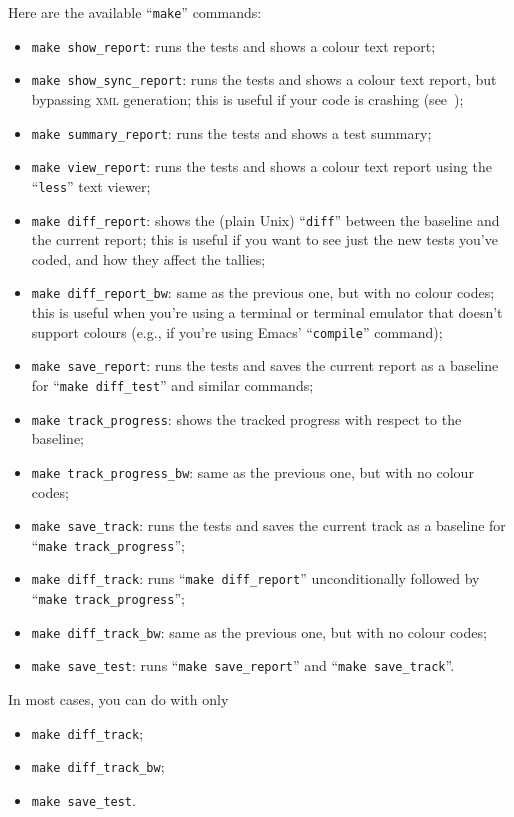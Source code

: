 \documentclass[twoside, a4paper, article]{memoir}
\begin{document}
Here are the available ``\texttt{make}'' commands:
\begin{itemize}
\item \texttt{make show\_report}: runs the tests and shows a colour text report;
\item \texttt{make show\_sync\_report}: runs the tests and shows a colour text
  report, but bypassing \textsc{xml} generation; this is useful if your code is
  crashing (see~);
\item \texttt{make summary\_report}: runs the tests and shows a test summary;
\item \texttt{make view\_report}: runs the tests and shows a colour text report
  using the ``\texttt{less}'' text viewer;
\item \texttt{make diff\_report}: shows the (plain Unix) ``\texttt{diff}''
  between the baseline and the current report; this is useful if you want to
  see just the new tests you've coded, and how they affect the tallies;
\item \texttt{make diff\_report\_bw}: same as the previous one, but with no
  colour codes; this is useful when you're using a terminal or terminal
  emulator that doesn't support colours (e.g., if you're using Emacs'
  ``\texttt{compile}'' command);
\item \texttt{make save\_report}: runs the tests and saves the current report
  as a baseline for ``\texttt{make diff\_test}'' and similar commands;
\item \texttt{make track\_progress}: shows the tracked progress with respect to
  the baseline;
\item \texttt{make track\_progress\_bw}: same as the previous one, but with no
  colour codes;
\item \texttt{make save\_track}: runs the tests and saves the current track as
  a baseline for ``\texttt{make track\_progress}'';
\item \texttt{make diff\_track}: runs ``\texttt{make diff\_report}''
  unconditionally followed by ``\texttt{make track\_progress}'';
\item \texttt{make diff\_track\_bw}: same as the previous one, but with no
  colour codes;
\item \texttt{make save\_test}: runs ``\texttt{make save\_report}'' and
  ``\texttt{make save\_track}''.
\end{itemize}

In most cases, you can do with only
\begin{itemize}
\item \texttt{make diff\_track};
\item \texttt{make diff\_track\_bw};
\item \texttt{make save\_test}.
\end{itemize}
\end{document}
